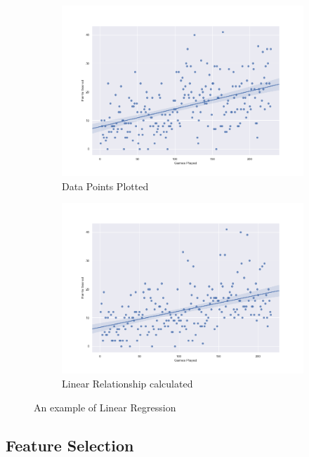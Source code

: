 \documentclass[a4paper,11pt,twoside]{article}
\begin{document}
\begin{figure} [h!]
  \centering
  \begin{subfigure}[b]{0.45\textwidth}
    \includegraphics[width=\textwidth]{../players/player24.png}
    \caption{Data Points Plotted}
    \label{fig:1}
  \end{subfigure}
  \begin{subfigure}[b]{0.45\textwidth}
    \includegraphics[width=\textwidth]{../players/player3.png}
    \caption{Linear Relationship calculated}
    \label{fig:2}
  \end{subfigure}
  \caption{An example of Linear Regression}
  \label{fig:3}
\end{figure}



\subsection{Feature Selection}
\end{document}
